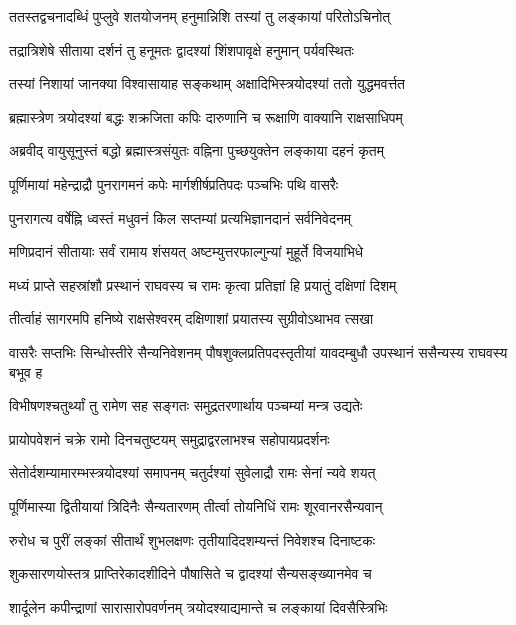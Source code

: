 \twolineshloka
{ततस्तद्वचनादब्धिं पुप्लुवे शतयोजनम्}
{हनुमान्निशि तस्यां तु लङ्कायां परितोऽचिनोत्}%

\twolineshloka
{तद्रात्रिशेषे सीताया दर्शनं तु हनूमतः}
{द्वादश्यां शिंशपावृक्षे हनुमान् पर्यवस्थितः}%

\twolineshloka
{तस्यां निशायां जानक्या विश्वासायाह सङ्कथाम्}
{अक्षादिभिस्त्रयोदश्यां ततो युद्धमवर्त्तत}%

\twolineshloka
{ब्रह्मास्त्रेण त्रयोदश्यां बद्धः शक्रजिता कपिः}
{दारुणानि च रूक्षाणि वाक्यानि राक्षसाधिपम्}%

\twolineshloka
{अब्रवीद् वायुसूनुस्तं बद्धो ब्रह्मास्त्रसंयुतः}
{वह्निना पुच्छयुक्तेन लङ्काया दहनं कृतम्}%

\twolineshloka
{पूर्णिमायां महेन्द्राद्रौ पुनरागमनं कपेः}
{मार्गशीर्षप्रतिपदः पञ्चभिः पथि वासरैः}%

\twolineshloka
{पुनरागत्य वर्षेह्नि ध्वस्तं मधुवनं किल}
{सप्तम्यां प्रत्यभिज्ञानदानं सर्वनिवेदनम्}%

\twolineshloka
{मणिप्रदानं सीतायाः सर्वं रामाय शंसयत्}
{अष्टम्युत्तरफाल्गुन्यां मुहूर्ते विजयाभिधे}%

\twolineshloka
{मध्यं प्राप्ते सहस्रांशौ प्रस्थानं राघवस्य च}
{रामः कृत्वा प्रतिज्ञां हि प्रयातुं दक्षिणां दिशम्}%

\twolineshloka
{तीर्त्वाहं सागरमपि हनिष्ये राक्षसेश्वरम्}
{दक्षिणाशां प्रयातस्य सुग्रीवोऽथाभव त्सखा}%

\threelineshloka
{वासरैः सप्तभिः सिन्धोस्तीरे सैन्यनिवेशनम्}
{पौषशुक्लप्रतिपदस्तृतीयां यावदम्बुधौ}
{उपस्थानं ससैन्यस्य राघवस्य बभूव ह}%

\twolineshloka
{विभीषणश्चतुर्थ्यां तु रामेण सह सङ्गतः}
{समुद्रतरणार्थाय पञ्चम्यां मन्त्र उद्यतेः}%

\twolineshloka
{प्रायोपवेशनं चक्रे रामो दिनचतुष्टयम्}
{समुद्राद्वरलाभश्च सहोपायप्रदर्शनः}%

\twolineshloka
{सेतोर्दशम्यामारम्भस्त्रयोदश्यां समापनम्}
{चतुर्दश्यां सुवेलाद्रौ रामः सेनां न्यवे शयत्}%

\twolineshloka
{पूर्णिमास्या द्वितीयायां त्रिदिनैः सैन्यतारणम्}
{तीर्त्वा तोयनिधिं रामः शूरवानरसैन्यवान्}%

\twolineshloka
{रुरोध च पुरीं लङ्कां सीतार्थं शुभलक्षणः}
{तृतीयादिदशम्यन्तं निवेशश्च दिनाष्टकः}%

\twolineshloka
{शुकसारणयोस्तत्र प्राप्तिरेकादशीदिने}
{पौषासिते च द्वादश्यां सैन्यसङ्ख्यानमेव च}%

\twolineshloka
{शार्दूलेन कपीन्द्राणां सारासारोपवर्णनम्}
{त्रयोदश्याद्यमान्ते च लङ्कायां दिवसैस्त्रिभिः}%

